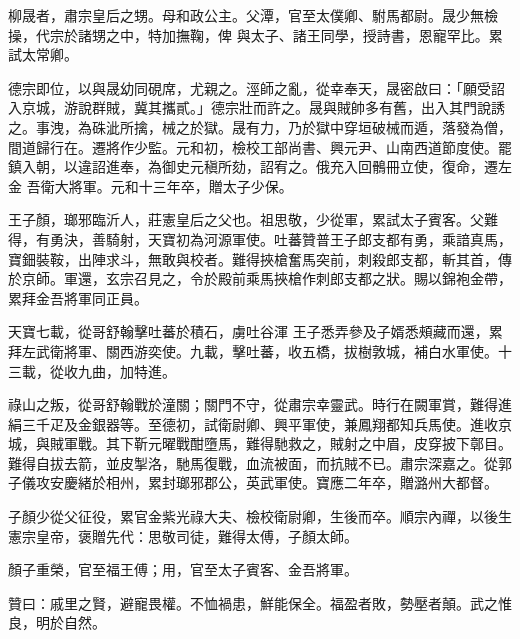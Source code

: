 \begin{pinyinscope}
 柳晟者，肅宗皇后之甥。母和政公主。父潭，官至太僕卿、駙馬都尉。晟少無檢操，代宗於諸甥之中，特加撫鞠，俾
 與太子、諸王同學，授詩書，恩寵罕比。累試太常卿。



 德宗即位，以與晟幼同硯席，尤親之。涇師之亂，從幸奉天，晟密啟曰：「願受詔入京城，游說群賊，冀其攜貳。」德宗壯而許之。晟與賊帥多有舊，出入其門說誘之。事洩，為硃泚所擒，械之於獄。晟有力，乃於獄中穿垣破械而遁，落發為僧，間道歸行在。遷將作少監。元和初，檢校工部尚書、興元尹、山南西道節度使。罷鎮入朝，以違詔進奉，為御史元稹所劾，詔宥之。俄充入回鶻冊立使，復命，遷左金
 吾衛大將軍。元和十三年卒，贈太子少保。



 王子顏，瑯邪臨沂人，莊憲皇后之父也。祖思敬，少從軍，累試太子賓客。父難得，有勇決，善騎射，天寶初為河源軍使。吐蕃贊普王子郎支都有勇，乘諳真馬，寶鈿裝鞍，出陣求斗，無敢與校者。難得挾槍奮馬突前，刺殺郎支都，斬其首，傳於京師。軍還，玄宗召見之，令於殿前乘馬挾槍作刺郎支都之狀。賜以錦袍金帶，累拜金吾將軍同正員。



 天寶七載，從哥舒翰擊吐蕃於積石，虜吐谷渾
 王子悉弄參及子婿悉頰藏而還，累拜左武衛將軍、關西游奕使。九載，擊吐蕃，收五橋，拔樹敦城，補白水軍使。十三載，從收九曲，加特進。



 祿山之叛，從哥舒翰戰於潼關；關門不守，從肅宗幸靈武。時行在闕軍賞，難得進絹三千疋及金銀器等。至德初，試衛尉卿、興平軍使，兼鳳翔都知兵馬使。進收京城，與賊軍戰。其下靳元曜戰酣墮馬，難得馳救之，賊射之中眉，皮穿披下鄣目。難得自拔去箭，並皮掣洛，馳馬復戰，血流被面，而抗賊不已。肅宗深嘉之。從郭子儀攻安慶緒於相州，累封瑯邪郡公，英武軍使。寶應二年卒，贈潞州大都督。



 子顏少從父征役，累官金紫光祿大夫、檢校衛尉卿，生後而卒。順宗內禪，以後生憲宗皇帝，褒贈先代：思敬司徒，難得太傅，子顏太師。



 顏子重榮，官至福王傅；用，官至太子賓客、金吾將軍。



 贊曰：戚里之賢，避寵畏權。不恤禍患，鮮能保全。福盈者敗，勢壓者顛。武之惟良，明於自然。



\end{pinyinscope}